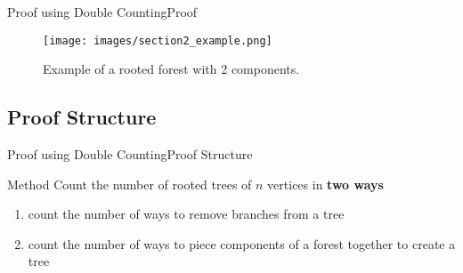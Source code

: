 \documentclass[10pt]{beamer}
\theoremstyle{definition}
\newcommand{\Stwo}{Proof using Double Counting}
\newcommand{\StwoSSstructure}{Proof Structure}
\newcommand{\StwoSSproof}{Proof}
\begin{document}
\begin{frame}{\Stwo}{\StwoSSproof}

\begin{figure}
  \texttt{[image: images/section2\_example.png]}
  \caption{Example of a rooted forest with 2 components.}
  \label{fig:section2_example}
\end{figure}

\end{frame}

\subsection{\StwoSSstructure}
\begin{frame}{\Stwo}{\StwoSSstructure}
\begin{block}{Method}
Count the number of rooted trees of $n$ vertices in \textbf{two ways}
\begin{enumerate}
  \item count the number of ways to remove branches from a tree
  \pause
  \item count the number of ways to piece components of a forest together to create a tree
\end{enumerate}
\end{block}

\end{frame}

\end{document}
